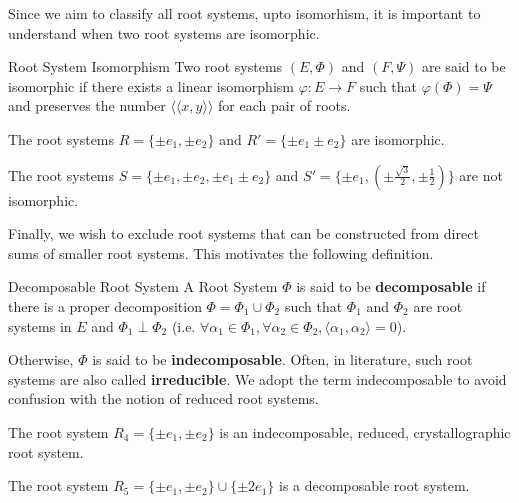 Since we aim to classify all root systems, upto isomorhism, it is important to understand when two root systems are isomorphic. \newline

\begin{nameddefinition}{Root System Isomorphism}
    Two root systems $(E, \Phi)$ and $(F,\Psi)$ are said to be isomorphic if there exists a linear isomorphism $\varphi: E \to F$ such that $\varphi(\Phi) = \Psi$
    and preserves the number $\langle \langle x, y \rangle \rangle$ for each pair of roots.
\end{nameddefinition}

\begin{example}
    The root systems $R = \{ \pm e_1, \pm e_2 \} $ and $R' = \{ \pm e_1 \pm e_2 \}$ are isomorphic.
\end{example}

\begin{example}
    The root systems $S = \{ \pm e_1, \pm e_2, \pm e_1 \pm e_2 \} $ and $S' = \{ \pm e_1, (\pm \frac{\sqrt{3}}{2}, \pm \frac{1}{2}) \}$ are not isomorphic.
\end{example}

Finally, we wish to exclude root systems that can be constructed from direct sums of smaller root systems.
This motivates the following definition. \newline

\begin{nameddefinition}{Decomposable Root System}
    A Root System $\Phi$ is said to be \textbf{decomposable} if there is a proper decomposition
    $\Phi = \Phi_1 \cup \Phi_2$ such that $\Phi_1$ and $\Phi_2$ are root systems in $E$ and $\Phi_1 \perp \Phi_2$ (i.e. 
    $\forall \alpha_1 \in \Phi_1 , \forall \alpha_2 \in \Phi_2,  \langle \alpha_1, \alpha_2 \rangle = 0$). \newline 

    Otherwise, $\Phi$ is said to be \textbf{indecomposable}. 
    Often, in literature, such root systems are also called \textbf{irreducible}.
    We adopt the term indecomposable to avoid confusion with the notion of reduced root systems.
\end{nameddefinition}

\begin{example}
    The root system $R_4 = \{ \pm e_1, \pm e_2 \}$ is an indecomposable, reduced, crystallographic root system.
\end{example}

\begin{example}
    The root system $R_5 = \{ \pm e_1, \pm e_2 \} \cup \{ \pm 2 e_1 \}$ is a decomposable root system.
\end{example}


